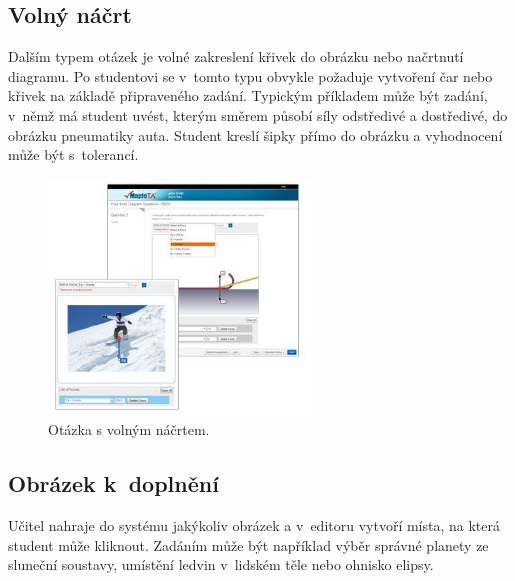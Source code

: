 \documentclass[
print,
  11pt,
  table,   
  nolof,    
  nolot,
  oneside,
  draft
]{fithesis3}
\begin{document}
	\subsection{Volný náčrt}
Dalším typem otázek je volné zakreslení křivek do obrázku nebo načrtnutí diagramu. Po studentovi se v~tomto typu obvykle požaduje vytvoření čar nebo křivek na základě připraveného zadání. Typickým příkladem může být zadání, v~němž má student uvést, kterým směrem působí síly odstředivé a dostředivé, do obrázku pneumatiky auta. Student kreslí šipky přímo do obrázku a vyhodnocení může být s~tolerancí.
  		\begin{figure}[hbt]
		  \begin{center}
		    \includegraphics[width=70mm]{images/MapleTA_paint.png}
		   \end{center}
		  \caption{Otázka s volným náčrtem.  \cite{maple-questions}}
		  \label{fig:maplepaint}
		\end{figure}

	\subsection{Obrázek k~doplnění}
Učitel nahraje do systému jakýkoliv obrázek a v~editoru vytvoří místa, na která student může kliknout. Zadáním může být například výběr správné planety ze sluneční soustavy, umístění ledvin v~lidském těle nebo ohnisko elipsy.
 
\end{document}
